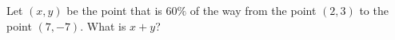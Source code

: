 Let $(x,y)$ be the point that is $60\%$ of the way from the point $(2,3)$ to the point $(7,-7)$. What is $x+y$?
